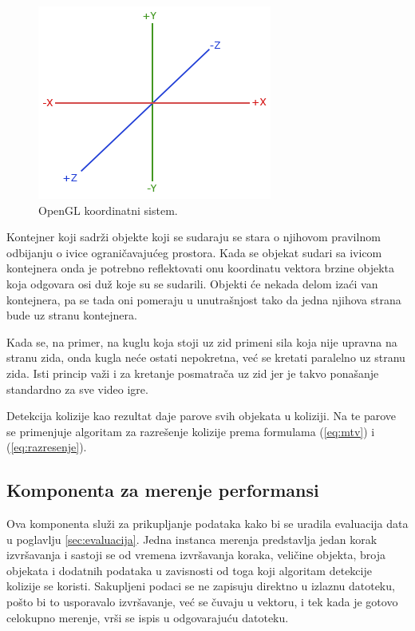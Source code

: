 \documentclass[12pt,oneside]{memoir}
\begin{document}
\begin{figure}[h!]
	\centerfloat
	\includegraphics[scale=0.75]{coord.png}
	\caption{OpenGL koordinatni sistem.}
	\label{fig:coord}
\end{figure}

Kontejner koji sadrži objekte koji se sudaraju se stara o njihovom pravilnom odbijanju o ivice ograničavajućeg prostora.
Kada se objekat sudari sa ivicom kontejnera onda je potrebno reflektovati onu koordinatu vektora
brzine objekta koja odgovara osi duž koje su se sudarili.
Objekti će nekada delom izaći van kontejnera, pa se tada oni pomeraju u unutrašnjost tako da jedna njihova strana bude uz stranu kontejnera.

Kada se, na primer, na kuglu koja stoji uz zid primeni sila koja nije upravna na stranu zida, onda kugla neće ostati nepokretna,
već se kretati paralelno uz stranu zida. Isti princip važi i za kretanje posmatrača uz zid jer je 
takvo ponašanje standardno za sve video igre.

Detekcija kolizije kao rezultat daje parove svih objekata u koliziji. 
Na te parove se primenjuje algoritam za razrešenje kolizije prema formulama (\ref{eq:mtv}) i (\ref{eq:razresenje}).

\subsection{Komponenta za merenje performansi}
\label{sec:perf}

Ova komponenta služi za prikupljanje podataka kako bi se uradila evaluacija data u poglavlju \ref{sec:evaluacija}.
Jedna instanca merenja predstavlja jedan korak izvršavanja i sastoji se od 
vremena izvršavanja koraka, veličine objekta, broja objekata i dodatnih podataka u zavisnosti od toga 
koji algoritam detekcije kolizije se koristi. 
Sakupljeni podaci se ne zapisuju direktno u izlaznu datoteku, pošto bi 
to usporavalo izvršavanje, već se čuvaju u vektoru, 
i tek kada je gotovo celokupno merenje, vrši se ispis u odgovarajuću datoteku.
\end{document}
